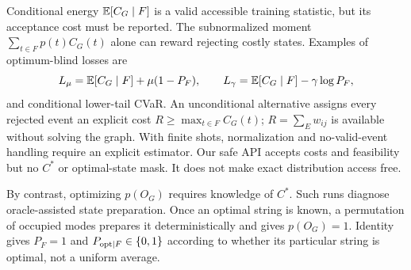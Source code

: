 Conditional energy $\mathbb E[C_G\mid F]$ is a valid accessible training statistic, but its acceptance cost must be reported. The subnormalized moment $\sum_{t\in F}p(t)C_G(t)$ alone can reward rejecting costly states. Examples of optimum-blind losses are
\begin{equation}
 L_\mu=\mathbb E[C_G\mid F]+\mu(1-P_F),\qquad
 L_\gamma=\mathbb E[C_G\mid F]-\gamma\log P_F,\label{eq:train}
\end{equation}
and conditional lower-tail CVaR. An unconditional alternative assigns every rejected event an explicit cost $R\ge\max_{t\in F}C_G(t)$; $R=\sum_Ew_{ij}$ is available without solving the graph. With finite shots, normalization and no-valid-event handling require an explicit estimator. Our safe API accepts costs and feasibility but no $C^*$ or optimal-state mask. It does not make exact distribution access free.

By contrast, optimizing $p(O_G)$ requires knowledge of $C^*$. Such runs diagnose oracle-assisted state preparation. Once an optimal string is known, a permutation of occupied modes prepares it deterministically and gives $p(O_G)=1$. Identity gives $P_F=1$ and $P_{\mathrm{opt}\mid F}\in\{0,1\}$ according to whether its particular string is optimal, not a uniform average.
